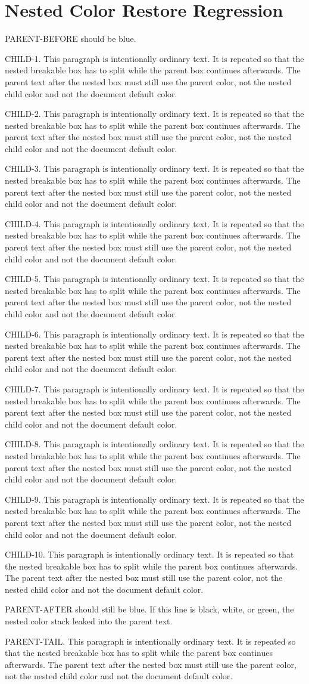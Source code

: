 \documentclass[a4paper,11pt]{article}
\newcommand{\filltext}[1]{%
  #1. This paragraph is intentionally ordinary text. It is repeated so that the
  nested breakable box has to split while the parent box continues afterwards.
  The parent text after the nested box must still use the parent color, not the
  nested child color and not the document default color.

}
\begin{document}
\section*{Nested Color Restore Regression}

\begin{ParentColorBox}
PARENT-BEFORE should be blue.

\begin{ChildColorBox}
\filltext{CHILD-1}
\filltext{CHILD-2}
\filltext{CHILD-3}
\filltext{CHILD-4}
\filltext{CHILD-5}
\filltext{CHILD-6}
\filltext{CHILD-7}
\filltext{CHILD-8}
\filltext{CHILD-9}
\filltext{CHILD-10}
\end{ChildColorBox}

PARENT-AFTER should still be blue. If this line is black, white, or green, the
nested color stack leaked into the parent text.

\filltext{PARENT-TAIL}
\end{ParentColorBox}
\end{document}
